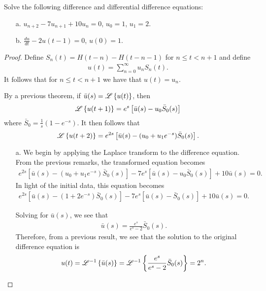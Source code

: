 \begin{problem}{7}
  Solve the following difference and differential difference equations:
  \begin{enumerate}
    \item[a.] $u_{n+2} - 7u_{n+1}+10 u_n = 0$, $u_0 = 1$, $u_1 = 2$.
    \item[b.] $\frac{du}{dt} - 2u(t-1) =0$, $u(0) = 1$.
  \end{enumerate}
\end{problem}

\begin{proof}
  Define $S_n(t) = H(t-n) - H(t-n-1)$ for $n \leq t < n+1$ and define
  \begin{align*}
    u(t) = \sum_{n=0}^\infty u_n S_n(t).
  \end{align*}
  It follows that for $n \leq t < n+1$ we have that $u(t) = u_n$.

  By a previous theorem, if $\bar{u}(s) = \mathscr{L}\left\{ {u(t)} \right\}$, then
  \begin{align*}
    \mathscr{L}\left\{ {u(t+1)} \right\} = e^s\left[\bar{u}(s)-u_0 \bar{S}_0(s)\right]
  \end{align*}
  where $\bar{S}_0 = \frac{1}{s}\left(1-e^{-s}\right)$. It then follows that
  \begin{align*}
    \mathscr{L}\left\{ {u(t+2)} \right\} = e^{2s}\left[\bar{u}(s)-(u_0 + u_1e^{-s})\bar{S}_0(s)\right].
  \end{align*}

  \begin{enumerate}
    \item[a.] We begin by applying the Laplace transform to the difference equation. From the previous remarks,
      the transformed equation becomes
      \begin{align*}
        e^{2s}\left[\bar{u}(s)-(u_0 + u_1e^{-s})\bar{S}_0(s)\right] -7e^s\left[\bar{u}(s)-u_0 \bar{S}_0(s)\right] + 10 \bar{u}(s) = 0.
      \end{align*}
      In light of the initial data, this equation becomes
      \begin{align*}
        e^{2s}\left[\bar{u}(s)-(1 + 2e^{-s})\bar{S}_0(s)\right] -7e^s\left[\bar{u}(s)- \bar{S}_0(s)\right] + 10 \bar{u}(s) = 0.
      \end{align*}

      Solving for $\bar{u}(s)$, we see that
      \begin{align*}
        \bar{u}(s) = \frac{e^s}{e^s-2}\bar{S}_0(s).
      \end{align*}
      Therefore, from a previous result, we see that the solution to the original difference equation is
      \begin{align*}
        u(t) = \mathscr{L}^{-1}\left\{ {\bar{u}(s)} \right\} = \mathscr{L}^{-1}\left\{ {\frac{e^s}{e^s-2}\bar{S}_0(s)} \right\} = 2^n.
      \end{align*}


\end{enumerate}
\end{proof}
